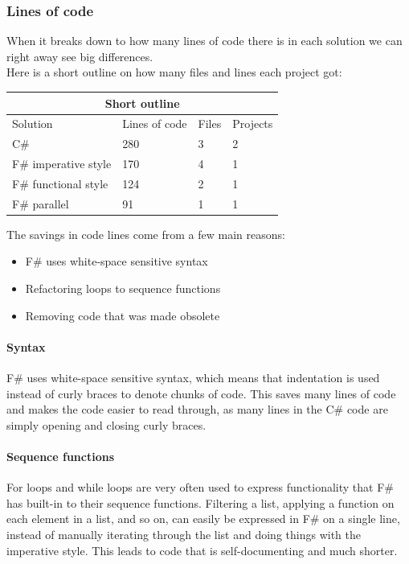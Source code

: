\documentclass[12pt, a4paper]{article}
\begin{document}
\newpage

\subsubsection{Lines of code}
\label{linesOfCode}
When it breaks down to how many lines of code there is in each solution we can right away see big differences.\\

Here is a short outline on how many files and lines each project got:\\

\begin{tabular}{ |p{4cm}|p{3cm}|p{2cm}|p{3cm}|  }
 \hline
 \multicolumn{4}{|c|}{Short outline} \\
 \hline
 Solution & Lines of code & Files & Projects\\
 \hline
 C\# & 280 & 3 & 2\\
 F\# imperative style & 170 & 4 & 1\\
 F\# functional style & 124 & 2 & 1\\
 F\# parallel & 91 & 1 & 1\\
 \hline
\end{tabular}

The savings in code lines come from a few main reasons:
\begin{itemize}
	\item F\# uses white-space sensitive syntax
	\item Refactoring loops to sequence functions
	\item Removing code that was made obsolete
\end{itemize}

\paragraph{Syntax} F\# uses white-space sensitive syntax, which means that indentation is used instead of curly braces to denote chunks of code. This saves many lines of code and makes the code easier to read through, as many lines in the C\# code are simply opening and closing curly braces.

\paragraph{Sequence functions} For loops and while loops are very often used to express functionality that F\# has built-in to their sequence functions. Filtering a list, applying a function on each element in a list, and so on, can easily be expressed in F\# on a single line, instead of manually iterating through the list and doing things with the imperative style. This leads to code that is self-documenting and much shorter.
\end{document}
